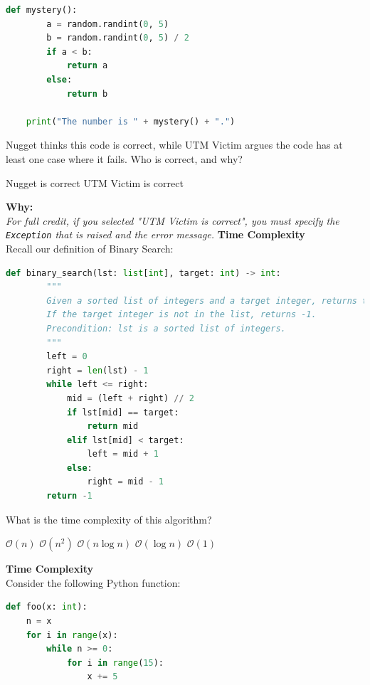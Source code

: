 \documentclass[letterpaper,13pt,addpoints]{exam}
\begin{document}
\begin{questions}
\begin{lstlisting}[language=Python, style=mystyle]
    def mystery():
        a = random.randint(0, 5)
        b = random.randint(0, 5) / 2
        if a < b:
            return a
        else:
            return b

    print("The number is " + mystery() + ".")
    \end{lstlisting}
    Nugget thinks this code is correct, while UTM Victim argues the code has at
    least one case where it fails. Who is correct, and why?
    \begin{choices}
        \choice Nugget is correct
        \choice UTM Victim is correct
    \end{choices}
    \textbf{Why:} \underline{\hspace{15cm}} \\
    \textit{For full credit, if you selected "UTM Victim is correct", you must specify the \texttt{Exception} that is raised and the error message.} \underline{\hspace{10cm}}
    \pagebreak
    \question[5] \textbf{Time Complexity} \\
    Recall our definition of Binary Search:
    \begin{lstlisting}[language=Python, style=mystyle]
    def binary_search(lst: list[int], target: int) -> int:
        """
        Given a sorted list of integers and a target integer, returns the index of the target integer in the list.
        If the target integer is not in the list, returns -1.
        Precondition: lst is a sorted list of integers.
        """
        left = 0
        right = len(lst) - 1
        while left <= right:
            mid = (left + right) // 2
            if lst[mid] == target:
                return mid
            elif lst[mid] < target:
                left = mid + 1
            else:
                right = mid - 1
        return -1
    \end{lstlisting}
    What is the time complexity of this algorithm?
    \begin{choices}
        \choice $\mathcal{O}(n)$
        \choice $\mathcal{O}(n^2)$
        \choice $\mathcal{O}(n\log n)$
        \choice $\mathcal{O}(\log n)$
        \choice $\mathcal{O}(1)$
    \end{choices}
    \question[5] \textbf{Time Complexity} \\
    Consider the following Python function:
    \begin{lstlisting}[language=Python, style=mystyle]
def foo(x: int):
    n = x
    for i in range(x):
        while n >= 0:
            for i in range(15):
                x += 5

\end{lstlisting}
\end{questions}
\end{document}
